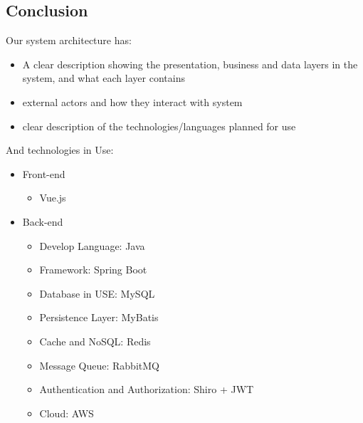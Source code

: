 \documentclass[12pt]{article}
\begin{document}
\subsection{Conclusion}
Our system architecture has:
\begin{itemize}
  \item A clear description showing the presentation, business and data layers in the system, and what each layer contains
  \item external actors and how they interact with system
\item clear description of the technologies/languages planned for use
\end{itemize}

And technologies in Use:
\begin{itemize}
  \item Front-end
  \begin{itemize}
    \item Vue.js
  \end{itemize}
\end{itemize}
\begin{itemize}
  \item Back-end
  \begin{itemize}
    \item Develop Language: Java
    \item  Framework: Spring Boot
    \item Database in USE: MySQL
    \item Persistence Layer: MyBatis
    \item Cache and NoSQL: Redis
    \item Message Queue: RabbitMQ
    \item Authentication and Authorization: Shiro + JWT
    \item Cloud: AWS
  \end{itemize}
\end{itemize}
\end{document}
